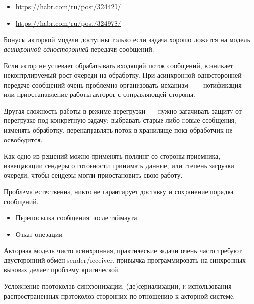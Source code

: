\secdown

\begin{itemize}[nosep]
\item \url{https://habr.com/ru/post/324420/}
\item \url{https://habr.com/ru/post/324978/}
\end{itemize}


Бонусы акторной модели доступны только если задача хорошо ложится на модель
\emph{асинхронной односторонней} передачи сообщений.


Если актор не успевает обрабатывать входящий поток сообщений, возникает неконтрлируемый рост
очереди на обработку. При асинхронной односторонней передаче сообщений очень проблемно
организовать механизм \ --- нотификация или приостановление работы акторов
с отправляющей стороны.

Другая сложность работы в режиме перегрузки\ --- нужно затачивать защиту от перегрузке под
конкретную задачу: выбравать старые либо новые сообщения, изменять обработку, перенаправлять
поток в хранилище пока обработчик не освободится.

Как одно из решений можно применять поллинг со стороны приемника, извещающий сендеры
о готовности принимать данные, или степень загрузки очереди, чтобы сендеры могли
приостановить свою работу.


Проблема естественна, никто не гарантирует доставку и сохранение порядка сообщений.
\begin{itemize}[nosep]
\item Перепосылка сообщения после таймаута
\item Откат операции
\end{itemize}


Акторная модель чисто асинхронная, практические задачи очень часто требуют двусторонний обмен
sender/receiver, привычка программировать на синхронных вызовах делает проблему критической.


Усложнение протоколов синхронизации, (де)сериализации, и использования распространенных
протоколов сторонних по отношению к акторной системе.

\secup
